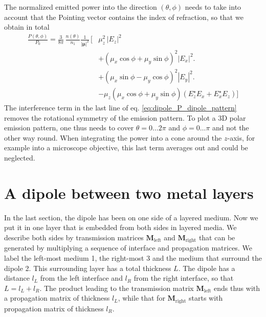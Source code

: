 The normalized emitted power into the direction $(\theta, \phi)$ needs to take into account that the Pointing vector contains the index of refraction, so that we obtain in total 
\begin{align} \label{eq:dipole_P_dipole_pattern}
\frac{P(\theta, \phi)}{P_0} = 
\frac{3}{8 \pi} \, \frac{n(\theta)}{n_1} \frac{1}{|\mathbf{\mu}|^2} \, 
\biggl[ 
& \mu_z^2 \, | E_z | ^2   \\
& + ( \mu_x \cos \phi + \mu_y \sin \phi)^2 | E_x | ^2  \biggl. \nonumber \\
& + ( \mu_x \sin \phi - \mu_y \cos \phi)^2 | E_y | ^2 \biggl. \nonumber \\
&  - \mu_z ( \mu_x \cos \phi + \mu_y \sin \phi) ( E_z^\star E_x + E_x^\star E_z)  \biggr] \nonumber 
\end{align}
The interference term in the last line of eq. \ref{eq:dipole_P_dipole_pattern} removes the rotational symmetry of  the emission pattern. To plot a 3D polar emission pattern, one thus needs to cover $\theta = 0 \dots 2 \pi$ and $\phi = 0 \dots \pi$ and not the other way round. When integrating the power into a cone around the $z$-axis, for example into a microscope objective, this last term averages out and could be neglected.



\section{A dipole between two metal layers}


In the last section, the dipole has been on one side of a layered medium. Now we put it in one layer that is embedded from both sides in layered media. We describe both sides by transmission matrices $\mathbf{M}_\text{left}$ and $\mathbf{M}_\text{right}$ that can be generated by multiplying  a sequence of interface and propagation matrices. We label the left-most medium 1, the right-most 3 and the medium that surround the dipole 2. This surrounding layer has a total thickness $L$. The dipole has a distance $l_L$ from the left interface and $l_R$ from the right interface, so that $L = l_L + l_R$. The product leading to the  transmission matrix $\mathbf{M}_\text{left}$ ends thus with a propagation matrix of thickness $l_L$, while that for  $\mathbf{M}_\text{right}$ starts with propagation matrix of thickness $l_R$.


